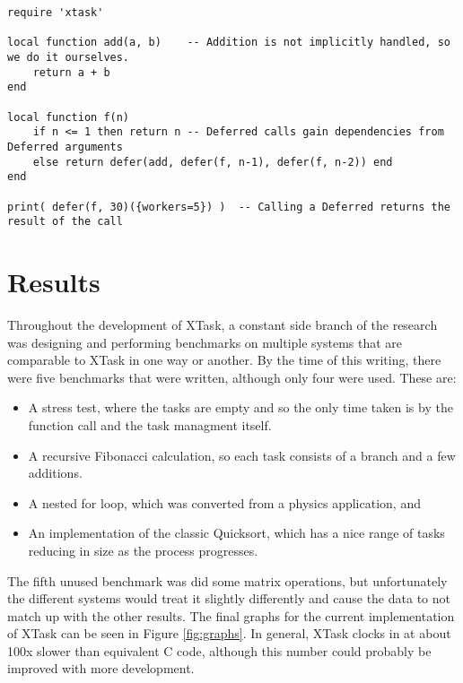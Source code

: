 \documentclass{article}
\begin{document}

\begin{verbatim}
require 'xtask'

local function add(a, b)    -- Addition is not implicitly handled, so we do it ourselves.
    return a + b
end

local function f(n)
    if n <= 1 then return n -- Deferred calls gain dependencies from Deferred arguments
    else return defer(add, defer(f, n-1), defer(f, n-2)) end 
end

print( defer(f, 30)({workers=5}) )  -- Calling a Deferred returns the result of the call
\end{verbatim}

\section{Results}
Throughout the development of XTask, a constant side branch of the research was designing and performing benchmarks on multiple systems that are comparable to XTask in one way or another. By the time of this writing, there were five benchmarks that were written, although only four were used. These are:
\begin{itemize}
    \item A stress test, where the tasks are empty and so the only time taken is by the function call and the task managment itself.
    \item A recursive Fibonacci calculation, so each task consists of a branch and a few additions.
    \item A nested for loop, which was converted from a physics application, and
    \item An implementation of the classic Quicksort, which has a nice range of tasks reducing in size as the process progresses.
\end{itemize}
The fifth unused benchmark was did some matrix operations, but unfortunately the different systems would treat it slightly differently and cause the data to not match up with the other results. The final graphs for the current implementation of XTask can be seen in Figure \ref{fig:graphs}. In general, XTask clocks in at about 100x slower than equivalent C code, although this number could probably be improved with more development.
\end{document}
